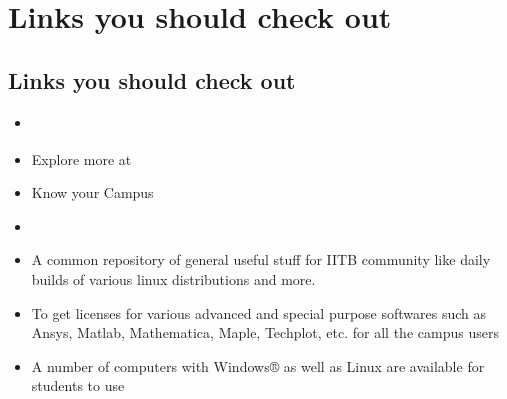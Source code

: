 \documentclass[openany]{book} %
\begin{document}
\bigbreak
\bigbreak

\chapter{Links you should check out}
\section{Links you should check out}
\begin{itemize}
	\item \href{https://www.ee.iitb.ac.in}{\color{blue}{Department Website}}
	\item Explore more at \href{http://www.iitb.ac.in/en/activities/student-clubs}{\color{blue}{Clubs at IITB}}
	\item \href{https://insti.app/feed}{\color{blue}{Insti App}} Know your Campus
	\item \href{https://gymkhana.iitb.ac.in/~scp/scp/index.html}{\color{blue}{Institute Students Companion Program (ISCP)}}
	\item \href{http://ftp.iitb.ac.in/}{\color{blue}{IIT Bombay FTP Server}} A common repository of  general useful stuff for IITB community like daily builds of various linux distributions and more.
	\item \href{https://www.cc.iitb.ac.in/}{\color{blue}{Computer Center}} To get licenses for various advanced and special purpose softwares such as Ansys, Matlab, Mathematica, Maple, Techplot, etc. for all the campus users
	\item \href{http://www.ee.iitb.ac.in/~pclab/index.php/}{\color{blue}{PC Lab}} A number of computers with Windows® as well as Linux are available for students to use
	
\end{itemize}


\end{document}
